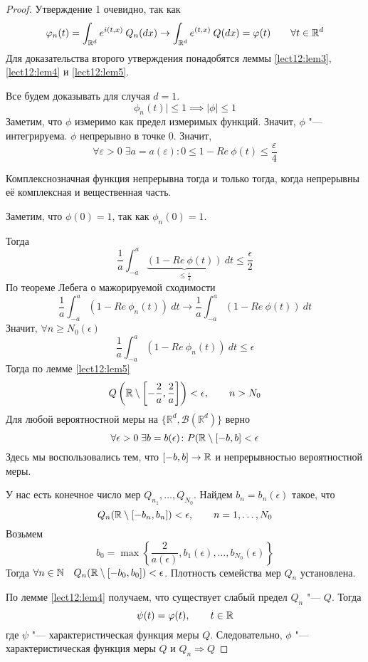 \begin{proof}
    Утверждение 1 очевидно, так как
    $$\varphi_n(t) = \int_{\mathbb{R}^d} e^{i(t, x)} \:Q_n(dx) \to \int_{\mathbb{R}^d} e^{(t, x)}\: Q(dx) = \varphi(t)\qquad \forall t \in \mathbb{R}^d$$
    Для доказательства второго утверждения понадобятся леммы \ref{lect12:lem3}, \ref{lect12:lem4} и \ref{lect12:lem5}. 

    Все будем доказывать для случая $d=1$.
$$\phi_n(t)| \leqslant 1 \implies |\phi| \leqslant 1 $$
Заметим, что $\phi$ измеримо как предел измеримых функций. Значит, $\phi$ "--- интегрируема.
    $\phi$ непрерывно в точке $0$. Значит,
    $$\forall \varepsilon > 0 \; \exists a = a(\varepsilon)\colon 0 \leqslant 1 - Re\: \phi(t) \leqslant \frac{\varepsilon}{4}$$
    \begin{nb}
        Комплекснозначная функция непрерывна тогда и только тогда, когда непрерывны её комплексная и вещественная часть.
    \end{nb}
    Заметим, что $\phi(0) = 1$, так как $\phi_n(0) = 1$.

    Тогда
    $$\frac{1}{a} \int_{-a}^a \underbrace{(1 - Re\:\phi(t))}_{\leqslant \frac{\epsilon}{4} }\:dt \leqslant \frac{\epsilon}{2} $$
    По теореме Лебега о мажорируемой сходимости
    $$\frac{1}{a} \int_{-a}^a (1 - Re\:\phi_n(t))\:dt \to \frac{1}{a} \int_{-a}^a (1 - Re\:\phi(t))\:dt$$
    Значит, $\forall n \geqslant N_0(\epsilon)$
    $$\frac{1}{a} \int_{-a}^a (1 - Re\:\phi_n(t))\:dt \leqslant \epsilon$$
    Тогда по лемме \ref{lect12:lem5}
    $$Q\left(\mathbb{R}\setminus \left[-\frac{2}{a}, \frac{2}{a}\right]\right) < \epsilon, \qquad n > N_0$$
Для любой вероятностной меры на $\{\mathbb{R}^d, \mathcal{B}(\mathbb{R}^d)\}$ верно
$$\forall \epsilon > 0 \; \exists b = b(\epsilon)\colon P(\mathbb{R}\setminus[-b, b] < \epsilon$$
Здесь мы воспользовались тем, что $[-b, b] \to \mathbb{R}$ и непрерывностью вероятностной меры.

У нас есть конечное число мер $Q_{n_1}, \ldots, Q_{N_0}$. Найдем $b_n = b_n(\epsilon)$ такое, что
$$Q_n(\mathbb{R}\setminus[-b_n, b_n]) < \epsilon, \qquad n = 1,\ldots,N_0$$
Возьмем
$$b_0 = \max{\left\{\frac{2}{a(\epsilon)}, b_1(\epsilon), \ldots, b_{N_0}(\epsilon) \right\}}$$
Тогда $\forall n \in \mathbb{N}\quad Q_n(\mathbb{R}\setminus [-b_0, b_0]) < \epsilon$. Плотность семейства мер $Q_n$ установлена.

По лемме \ref{lect12:lem4} получаем, что существует слабый предел $Q_n$ "--- $Q$. Тогда
$$\psi(t) = \varphi(t), \qquad t \in \mathbb{R}$$
где $\psi$ "--- характеристическая функция меры $Q$.
Следовательно, $\phi$ "--- характеристическая функция меры $Q$ и $Q_n \Rightarrow Q$
\end{proof}

